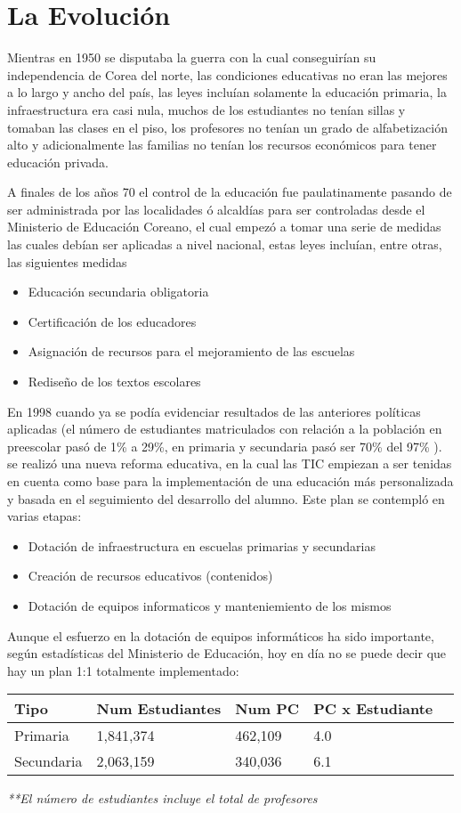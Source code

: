 \documentclass[conference]{IEEEtran}
\begin{document}
\section{La Evolución}
Mientras en 1950 se disputaba la guerra con la cual conseguirían su independencia de Corea del norte, las condiciones educativas no eran las mejores a lo largo y ancho del país, las leyes incluían solamente la educación primaria, la infraestructura era casi nula, muchos de los estudiantes no tenían sillas y tomaban las clases en el piso, los profesores no tenían un grado de alfabetización alto y adicionalmente las familias no tenían los recursos económicos para tener educación privada.

A finales de los años 70 el control de la educación fue paulatinamente pasando de ser administrada por las localidades ó alcaldías para ser controladas desde el Ministerio de Educación Coreano, el cual empezó a tomar una serie de medidas las cuales debían ser aplicadas a nivel nacional, estas leyes incluían, entre otras, las siguientes medidas
\begin{itemize}
  \item Educación secundaria obligatoria
  \item Certificación de los educadores
  \item Asignación de recursos para el mejoramiento de las escuelas
  \item Rediseño de los textos escolares
\end{itemize}

En 1998 cuando ya se podía evidenciar resultados de las anteriores políticas aplicadas (el número de estudiantes matriculados con relación a la población en preescolar pasó de 1\% a 29\%, en primaria y secundaria pasó ser 70\% del 97\% \cite{moe}). se realizó una nueva reforma educativa, en la cual las TIC empiezan a ser tenidas en cuenta como base para la implementación de una educación más personalizada y basada en el seguimiento del desarrollo del alumno. Este plan se contempló en varias etapas:
\begin{itemize}
  \item Dotación de infraestructura en escuelas primarias y secundarias
  \item Creación de recursos educativos (contenidos)
  \item Dotación de equipos informaticos y manteniemiento de los mismos
\end{itemize}
Aunque el esfuerzo en la dotación de equipos informáticos ha sido importante, según estadísticas del Ministerio de Educación, hoy en día no se puede decir que hay un plan 1:1 totalmente implementado: 
\begin{center}
    \begin{tabular}{| l | l | l | l | l |}
    \hline
    Tipo & Num Estudiantes & Num PC & PC x Estudiante \\ \hline
    Primaria & 1,841,374 & 462,109 & 4.0\\ \hline
    Secundaria & 2,063,159 & 340,036 & 6.1\\\hline
    \end{tabular}
\end{center}
\emph{**El número de estudiantes incluye el total de profesores\cite{moe:one}}
\end{document}

